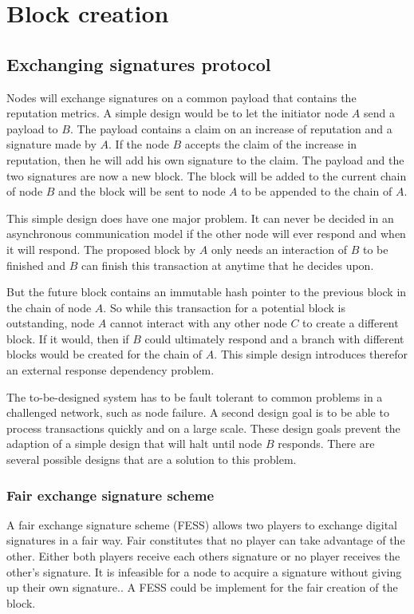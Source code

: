 \section{Block creation}

\subsection{Exchanging signatures protocol}
Nodes will exchange signatures on a common payload that contains the reputation metrics.
A simple design would be to let the initiator node $A$ send a payload to $B$.
The payload contains a claim on an increase of reputation and a signature made by $A$.
If the node $B$ accepts the claim of the increase in reputation,
then he will add his own signature to the claim.
The payload and the two signatures are now a new block.
The block will be added to the current chain of node $B$ 
and the block will be sent to node $A$ to be appended to the chain of $A$.

This simple design does have one major problem.
It can never be decided in an asynchronous communication model
if the other node will ever respond and when it will respond.
The proposed block by $A$ only needs an interaction of $B$ to be finished
and $B$ can finish this transaction at anytime that he decides upon.

But the future block contains an immutable hash pointer
to the previous block in the chain of node $A$.
So while this transaction for a potential block is outstanding,
node $A$ cannot interact with any other node $C$ to create a different block.
If it would, then if $B$ could ultimately respond and a branch with different blocks
would be created for the chain of $A$.
This simple design introduces therefor an external response dependency problem.

The to-be-designed system has to be fault tolerant to 
common problems in a challenged network, such as node failure.
A second design goal is to be able to process transactions quickly and on a large scale.
These design goals prevent the adaption of a simple design that will halt until node $B$ responds.
There are several possible designs that are a solution to this problem.

\subsubsection{Fair exchange signature scheme}
A fair exchange signature scheme (FESS) allows two players to exchange digital signatures in a fair way.
Fair constitutes that no player can take advantage of the other.
Either both players receive each others signature or no player receives the other's signature.
It is infeasible for a node to acquire a signature without giving up their own signature.\cite{asokan-fairexchange}.
A FESS could be implement for the fair creation of the block.

